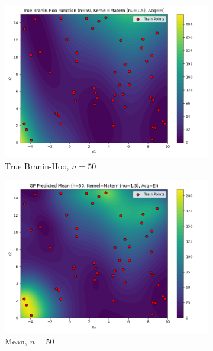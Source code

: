 \documentclass[a4paper,12pt]{article}
\begin{document}
\begin{figure}[H]
\begin{subfigure}{0.3\textwidth}
  \includegraphics[width=\linewidth]{Task-02/images/true_function_matern_n50_EI.png}
  \caption{True Branin-Hoo, $n=50$}
\end{subfigure}
\begin{subfigure}{0.3\textwidth}
    \includegraphics[width=\linewidth]{Task-02/images/gp_mean_matern_n50_EI.png}
    \caption{Mean, $n=50$}
\end{subfigure}
\begin{subfigure}{0.3\textwidth}

\end{subfigure}
\end{figure}
\end{document}
